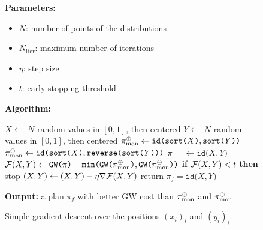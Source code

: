            \begin{figure}[H]
            \centering
            \begin{minipage}{.8\linewidth}
                \begin{algorithm}[H]
                \caption{Simple gradient descent over the positions $(x_i)_i$ and $(y_i)_i$.}
                \label{algorithm:gd}
                \vspace{1mm}
                \textbf{Parameters:}
                \begin{itemize}[nolistsep]
                    \item $N$: number of points of the distributions
                    \item $N_\text{iter}$: maximum number of iterations
                    \item $\eta$: step size
                    \item $t$: early stopping threshold
                \end{itemize}
                \vspace{3mm}
                \textbf{Algorithm:}
                \begin{algorithmic}[1]
                    \State $X\gets$ $N$ random values in $[0,1]$, then centered
                    \State $Y\gets$ $N$ random values in $[0,1]$, then centered
                    \State $\pi_\text{mon}^\oplus\gets\texttt{id(sort(}X\texttt{)},\texttt{sort(}Y\texttt{))}$ 
                    \State $\pi_\text{mon}^\ominus\gets\texttt{id(sort(}X\texttt{)},\texttt{reverse(sort(}Y\texttt{)))}$
                    \State $\pi_{\phantom{\text{mon}}}\gets\texttt{id(}X,Y\texttt{)}$
                    \State $\mathcal{F}(X,Y)\gets \texttt{GW(}\pi\texttt{)}-\texttt{min(GW(}\pi_\text{mon}^\oplus\texttt{)},\texttt{GW(}\pi_\text{mon}^\ominus\texttt{))}$ 
                    \State \textbf{if} $\mathcal{F}(X,Y)< t$ \textbf{then} stop 
                    \State $(X,Y)\gets (X,Y)-\eta\nabla\mathcal{F}(X,Y)$  
                    \EndFor
                    \State return $\pi_f=\texttt{id(}X,Y\texttt{)}$
                    \end{algorithmic}
                    \vspace{3mm}
                \textbf{Output:} a plan $\pi_f$ with better GW cost than $\pi_\text{mon}^\oplus$ and $\pi_\text{mon}^\ominus$
              \end{algorithm}
            \end{minipage}
            \end{figure}

